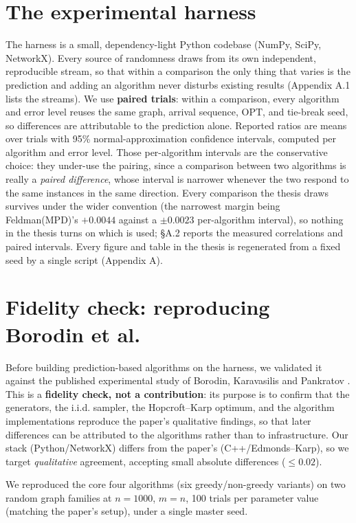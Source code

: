 \section{The experimental harness}

The harness is a small, dependency-light Python codebase (NumPy, SciPy,
NetworkX). Every source of randomness draws from its own independent,
reproducible stream, so that within a comparison the only thing that
varies is the prediction and adding an algorithm never disturbs existing
results (Appendix A.1 lists the streams). We use \textbf{paired trials}:
within a comparison, every algorithm and error level reuses the same
graph, arrival sequence, \(\mathrm{OPT}\), and tie-break seed, so
differences are attributable to the prediction alone. Reported ratios
are means over trials with 95\% normal-approximation confidence
intervals, computed per algorithm and error level. Those per-algorithm
intervals are the conservative choice: they under-use the pairing, since
a comparison between two algorithms is really a \emph{paired
difference}, whose interval is narrower whenever the two respond to the
same instances in the same direction. Every comparison the thesis draws
survives under the wider convention (the narrowest margin being
Feldman(MPD)'s \(+0.0044\) against a \(\pm0.0023\) per-algorithm
interval), so nothing in the thesis turns on which is used; §A.2 reports
the measured correlations and paired intervals. Every figure and table
in the thesis is regenerated from a fixed seed by a single script
(Appendix A).

\section{Fidelity check: reproducing Borodin et
al.}

Before building prediction-based algorithms on the harness, we validated
it against the published experimental study of Borodin, Karavasilis and
Pankratov \autocite{borodin2018experimental}. This is a \textbf{fidelity
check, not a contribution}: its purpose is to confirm that the
generators, the i.i.d. sampler, the Hopcroft--Karp optimum, and the
algorithm implementations reproduce the paper's qualitative findings, so
that later differences can be attributed to the algorithms rather than
to infrastructure. Our stack (Python/NetworkX) differs from the paper's
(C++/Edmonds--Karp), so we target \emph{qualitative} agreement,
accepting small absolute differences (\(\le 0.02\)).

We reproduced the core four algorithms (six greedy/non-greedy variants)
on two random graph families at \(n=1000\), \(m=n\), 100 trials per
parameter value (matching the paper's setup), under a single master
seed.

